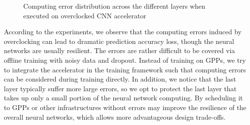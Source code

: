 \begin{figure*}
        \caption{Computing error distribution across the different layers when executed on overclocked CNN accelerator}
        \label{fig:error_distribute}
\end{figure*}

According to the experiments, we observe that the computing errors induced by 
overclocking can lead to dramatic prediction accuracy loss, though 
the neural networks are usually resilient. The errors are rather difficult to be
covered via offline training with noisy data and dropout. 
Instead of training on GPPs, we try to integrate the accelerator in the training framework 
such that computing errors can be considered during training directly. In addition, we notice 
that the last layer typically suffer more large errors, so we opt to protect the last layer 
that takes up only a small portion of the neural network computing. By scheduling it to GPPs 
or other infrastructures without errors may improve the resilience of the overall neural 
networks, which allows more advantageous design trade-offs.

